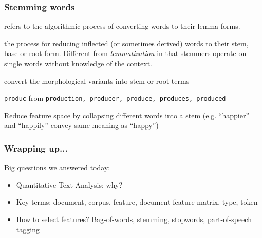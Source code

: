 \documentclass[notes=hide]{beamer}
\begin{document}
\begin{frame}
	\frametitle{Stemming words}
	\begin{description}[<+->]
		\item[Lemmatization] refers to the algorithmic process of
		converting words to their lemma forms.  \pause 
		\item[stemming] the
		process for reducing inflected (or sometimes derived) words to
		their stem, base or root form.  Different from
		\emph{lemmatization} in that stemmers operate on single words
		without knowledge of the context.
		\item[both] convert the morphological variants into stem or root terms
		\item[example:]
		\alert{\texttt{produc}} from \newline
		\texttt{production, producer, produce, produces, produced}
		\item[Why?] Reduce feature space by collapsing different words into a stem (e.g. ``happier'' and ``happily'' convey same meaning as ``happy'')
	\end{description}
\end{frame}



\begin{frame}
	\frametitle{Wrapping up...}
	Big questions we answered today:
	
	\begin{itemize}
		\item Quantitative Text Analysis: why?
		\item Key terms: document, corpus, feature, document feature matrix, type, token

		\item How to select features? Bag-of-words, stemming, stopwords, part-of-speech tagging
	\end{itemize}

\end{frame}
\end{document}
